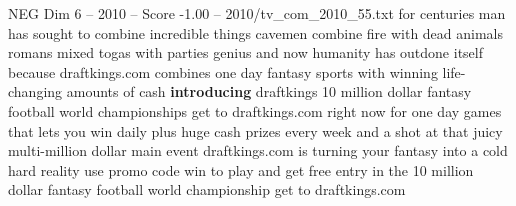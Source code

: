 \begin{textsample}{NEG Dim 6 – 2010 – Score -1.00 – 2010/tv\_com\_2010\_55.txt}  \label{ex:f6_neg_046}
for centuries man has sought to combine incredible things cavemen combine fire with dead animals romans mixed togas with parties genius and now humanity has outdone itself because draftkings.com combines one day fantasy sports with winning life-changing amounts of cash \textbf{introducing} draftkings 10 million dollar fantasy football world championships get to draftkings.com right now for one day games that lets you win daily plus huge cash prizes every week and a shot at that juicy multi-million dollar main event draftkings.com is turning your fantasy into a cold hard reality use promo code win to play and get free entry in the 10 million dollar fantasy football world championship get to draftkings.com

\end{textsample}
